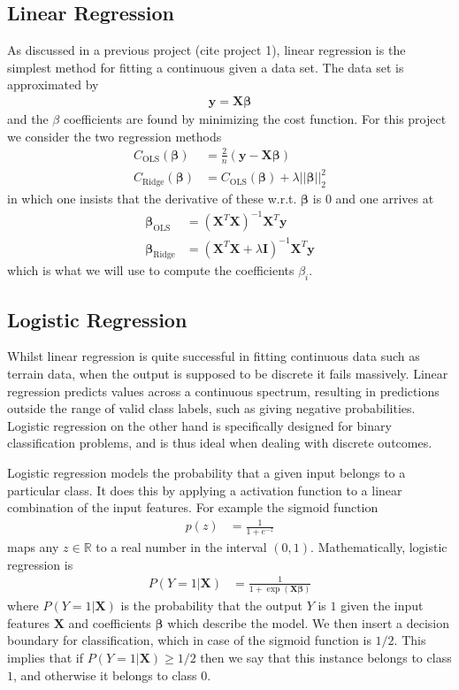 \documentclass[%
reprint,
amsmath,amssymb,
aps,
]{revtex4-2}
\begin{document}
\subsection{Linear Regression}
As discussed in a previous project (cite project 1), linear regression is the simplest method for fitting a continuous given a data set. The data set is approximated by
\begin{align}
	\bm y=\bm X\bm\beta
\end{align}
and the $\beta$ coefficients are found by minimizing the cost function. For this project we consider the two regression methods
\begin{align}
	C_\text{OLS}(\bm\beta)&=\frac{2}{n}(\bm y-\bm X\bm\beta)\\
	C_\text{Ridge}(\bm\beta)&=C_\text{OLS}(\bm\beta)+\lambda||\bm\beta||_2^2
\end{align}
in which one insists that the derivative of these w.r.t. $\bm\beta$ is $0$ and one arrives at
\begin{align}
	\bm\beta_\text{OLS}&=(\bm X^T\bm X)^{-1}\bm X^T\bm y\\
	\bm\beta_\text{Ridge}&=(\bm X^T\bm X+\lambda \bm I)^{-1}\bm X^T\bm y
\end{align}
which is what we will use to compute the coefficients $\beta_i$.

\subsection{Logistic Regression}
Whilst linear regression is quite successful in fitting continuous data such as terrain data, when the output is supposed to be discrete it fails massively. Linear regression predicts values across a continuous spectrum, resulting in predictions outside the range of valid class labels, such as giving negative probabilities. Logistic regression on the other hand is specifically designed for binary classification problems, and is thus ideal when dealing with discrete outcomes. 

Logistic regression models the probability that a given input belongs to a particular class. It does this by applying a activation function to a linear combination of the input features. For example the sigmoid function 
\begin{align}
	p(z)&=\frac{1}{1+e^{-z}}
\end{align}
maps any $z\in\mathbb{R}$ to a real number in the interval $(0,1)$. Mathematically, logistic regression is
\begin{align}
	P(Y=1|\bm X)&=\frac{1}{1+\exp(\bm X\bm\beta)}
\end{align}
where $P(Y=1|\bm X)$ is the probability that the output $Y$ is $1$ given the input features $\bm X$ and coefficients $\bm \beta$ which describe the model. We then insert a decision boundary for classification, which in case of the sigmoid function is $1/2$. This implies that if $P(Y=1|\bm X)\geq 1/2$ then we say that this instance belongs to class $1$, and otherwise it belongs to class $0$.
\end{document}
